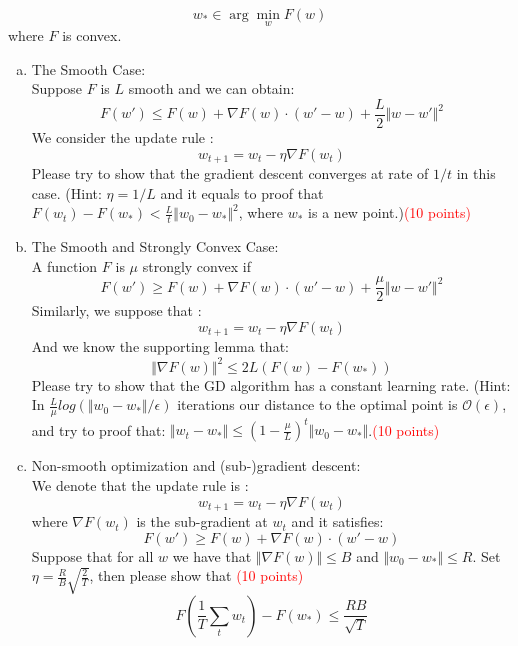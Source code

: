 \documentclass[11pt, a4paper]{article}
\begin{document}
\[
w_*\in \arg\min_w F(w)
\]
where $F$ is convex.  
\begin{enumerate}[(a)]
	\item The Smooth Case:\\
	Suppose $F$ is $L $ smooth and we can obtain:
	\[
	F(w')\leq F(w)+ \nabla F(w)\cdot (w' -w)+\frac{L}{2}\Vert w -w'\Vert^2
	\]
	We consider the update rule :\\
	\[
	w_{t+1}=w_t-\eta\nabla F(w_t)
    \]
    Please try to show that the gradient descent converges at rate of $1/t$ in this case. ({Hint:} $\eta = 1/L $ and it equals to proof that $F(w_t) - F(w_*)< \frac{L}{t }\Vert w_0-w_*\Vert^2 $, where $w_*$ is a new point.)\textcolor{red}{(10 points)}
    \item The Smooth and Strongly Convex Case:\\
 A function $F$ is $\mu$ strongly convex if 
 \[
F(w')\geq F(w)+\nabla F(w)\cdot (w' -w)+\frac{ \mu}{2}\Vert w-w'\Vert^2
\]
Similarly, we suppose that :
 \[
	w_{t+1}=w_t-\eta\nabla F(w_t)
    \]
And we know the supporting lemma that:
\[
\Vert \nabla F(w)\Vert^2 \leq 2L(F(w) - F(w_*))
\]
Please try to show that the GD algorithm has a constant learning rate. (Hint: In $\frac{L}{\mu}log(\Vert w_0-w_*\Vert/\epsilon )$ iterations our distance to the optimal point is $\mathcal{O}(\epsilon) $, and try to proof that: $\Vert w_t - w_*\Vert \leq ( 1- \frac{\mu}{L })^t\Vert w_0-w_*\Vert $.\textcolor{red}{(10 points)}
\item Non-smooth optimization and (sub-)gradient descent:\\
We denote that the update rule is :
\[
w_{t+1}=w_t-\eta\nabla F(w_t)
\]
where $ \nabla F(w_t)$ is the sub-gradient at $ w_t$ and it satisfies:
\[
F(w')\geq F(w) + \nabla F(w)\cdot (w'-w)
\]
Suppose that for all $w$ we have that $\Vert \nabla F(w)\Vert\leq B$ and $\Vert w_0-w_*\Vert\leq R $.  Set $\eta=\frac{R}{B}\sqrt{\frac{2}{T} } $, then please show that \textcolor{red}{(10 points)}
\[
F(\frac{1}{T}\sum_t w_t)-F(w_*)\leq \frac{RB}{\sqrt{T}}
\]

\end{enumerate}
\end{document}
